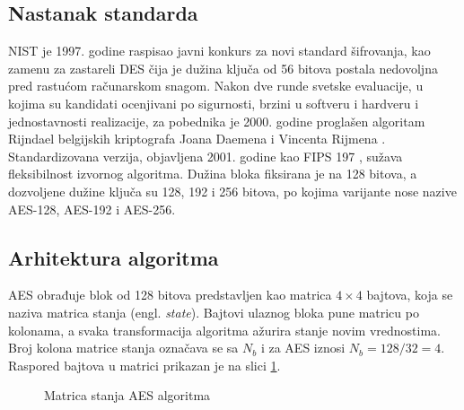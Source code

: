\subsection{Nastanak standarda}
\label{subsec:aes_istorijat}

NIST je 1997. godine raspisao javni konkurs za novi standard šifrovanja, kao zamenu za zastareli DES čija je dužina ključa od 56 bitova postala nedovoljna pred rastućom računarskom snagom. Nakon dve runde svetske evaluacije, u kojima su kandidati ocenjivani po sigurnosti, brzini u softveru i hardveru i jednostavnosti realizacije, za pobednika je 2000. godine proglašen algoritam Rijndael belgijskih kriptografa Joana Daemena i Vincenta Rijmena \cite{daemen_rijndael}. Standardizovana verzija, objavljena 2001. godine kao FIPS 197 \cite{fips197}, sužava fleksibilnost izvornog algoritma. Dužina bloka fiksirana je na 128 bitova, a dozvoljene dužine ključa su 128, 192 i 256 bitova, po kojima varijante nose nazive AES-128, AES-192 i AES-256.

\subsection{Arhitektura algoritma}
\label{subsec:aes_arhitektura}

AES obrađuje blok od 128 bitova predstavljen kao matrica $4 \times 4$ bajtova, koja se naziva matrica stanja (engl. \textit{state}). Bajtovi ulaznog bloka pune matricu po kolonama, a svaka transformacija algoritma ažurira stanje novim vrednostima. Broj kolona matrice stanja označava se sa $N_b$ i za AES iznosi $N_b = 128/32 = 4$. Raspored bajtova u matrici prikazan je na slici \ref{fig:aes_matrica_stanja}.

\begin{figure}[H]
\centering
{}
\caption{Matrica stanja AES algoritma}
\label{fig:aes_matrica_stanja}
\end{figure}


